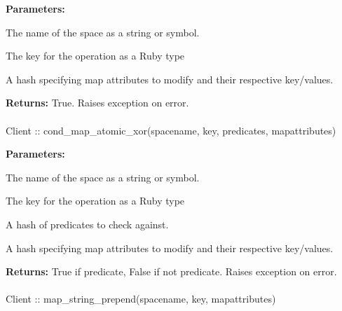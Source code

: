 \noindent\textbf{Parameters:}
\begin{description}[labelindent=\widthof{{\code{mapattributes}}},leftmargin=*,noitemsep,nolistsep,align=right]
\item[\code{spacename}] The name of the space as a string or symbol.
\item[\code{key}] The key for the operation as a Ruby type
\item[\code{mapattributes}] A hash specifying map attributes to modify and their respective key/values.
\end{description}

\noindent\textbf{Returns:}
True.  Raises exception on error.

\paragraph{}
\begin{ccode}
Client :: cond_map_atomic_xor(spacename, key, predicates, mapattributes)
\end{ccode}
\funcdesc 

\noindent\textbf{Parameters:}
\begin{description}[labelindent=\widthof{{\code{mapattributes}}},leftmargin=*,noitemsep,nolistsep,align=right]
\item[\code{spacename}] The name of the space as a string or symbol.
\item[\code{key}] The key for the operation as a Ruby type
\item[\code{predicates}] A hash of predicates to check against.
\item[\code{mapattributes}] A hash specifying map attributes to modify and their respective key/values.
\end{description}

\noindent\textbf{Returns:}
True if predicate, False if not predicate.  Raises exception on error.

\paragraph{}
\begin{ccode}
Client :: map_string_prepend(spacename, key, mapattributes)
\end{ccode}
\funcdesc 

